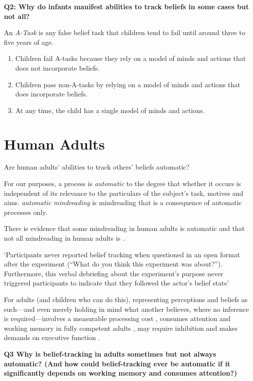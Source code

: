 \documentclass[12pt]{extarticle}
\begin{document}
\begin{multicols*}{3}
\textbf{Q2: Why do infants manifest abilities to track beliefs in some cases but not all?}

An \emph{A-Task} is any false belief task that children tend to fail until around
three to five years of age.

\begin{enumerate}
\item Children fail A-tasks
because they rely on a model of minds and actions that does not incorporate beliefs.
\item Children pass non-A-tasks
by relying on a model of minds and actions that does incorporate beliefs.
\item At any time, the child has a single model of minds and actions.
\end{enumerate}



\section{Human Adults}

Are human adults’ abilities to track others’ beliefs automatic?

For our purposes, a process is \emph{automatic} to the degree that whether it occurs is independent of
its relevance to the particulars of the subject's task, motives and aims.  \emph{automatic mindreading} is mindreading that is a consequence of
automatic processes only.


There is evidence that some mindreading in human adults is
 automatic
\citep[e.g.][]{kovacs_social_2010,Schneider:2011fk,Wel:2013uq} and
that not all mindreading in human adults is
\citep{apperly:2008_back,apperly_why_2010,Wel:2013uq}.

‘Participants never reported belief tracking when questioned in an open format after the experiment
(“What do you think this experiment was about?”). Furthermore, this verbal debriefing about the
experiment’s purpose never triggered participants to indicate that they followed the actor’s belief
state’ \citep[p.~2]{Schneider:2011fk}


For adults (and children who can do this),
representing perceptions and beliefs as such---and even merely holding in mind
what another believes, where no inference is required---involves a measurable
processing cost \citep{apperly:2008_back,apperly:2010_limits}, consumes attention
and working memory in fully competent adults \citealp{Apperly:2009cc,
lin:2010_reflexively, McKinnon:2007rr},  may require inhibition \citep{bull:2008_role}
and makes demands on executive function \citep{apperly:2004_frontal,samson:2005_seeing}.

\textbf{Q3 Why is belief-tracking in adults sometimes but not always automatic?
(And how could belief-tracking ever be automatic if it significantly depends on working memory and consumes attention?)}



\footnotesize


\end{multicols*}
\end{document}

